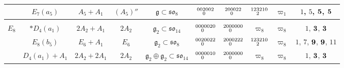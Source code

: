 \documentclass{amsart}
\theoremstyle{definition}
\newcommand{\g}{\mathfrak{g}}
\newcommand{\0}{\mathcal{O}}
\begin{document}
\begin{table}[htp]
\begin{center}
\begin{tabular}{|c | c| c| c| c| c| c| c| c| c|}
& $E_7(a_5)$ & $A_5+A_1$ & $(A_5)''$ & $\g\subset\mathfrak{so}_8$ & $\scriptsize{\begin{aligned}00 &2002 \\[-1.8mm] &0\end{aligned}}$ & $\scriptsize{\begin{aligned}20 &0022 \\[-1.8mm] &0\end{aligned}}$ 
& $\scriptsize{\begin{aligned} 12 & 3210 \\[-1.8mm] & 2\end{aligned}}$ & $\varpi_1$ 
& $1$, $5$, ${\bf 5}$, ${\bf 5}$ \\

\hline & & & & & & &  & &  \\[-0.3cm]

$E_8$ & $*D_4(a_1)$ & $2A_2+A_1$ & $2A_2$ & $\g_2\subset\mathfrak{so}_{14}$  & $\scriptsize{\begin{aligned}00 &00020 \\[-1.8mm] &0\end{aligned}}$ & $\scriptsize{\begin{aligned}20 &00000 \\[-1.8mm] &0\end{aligned}}$ 
& $\varpi_8$ & $\varpi_8$ 
& $1$, ${\bf 3}$, ${\bf 3}$ \\

& $E_8(b_5)$ & $E_6+A_1$ & $E_6$ & $\g_2\subset \mathfrak{so}_8$ & $\scriptsize{\begin{aligned}00 &20022 \\[-1.8mm] &0\end{aligned}}$ & $\scriptsize{\begin{aligned}20 &00222 \\[-1.8mm] &0\end{aligned}}$ 
& $\scriptsize{\begin{aligned} 12 & 3210 \\[-1.8mm] & 2\end{aligned}}$ & $\varpi_8$ 
& $1$, $7$, ${\bf 9}$, ${\bf 9}$, $11$ \\
& $D_4(a_1)+A_1$ & $2A_2+2A_1$ & $2A_2$ & $\g_2\oplus\g_2\subset\mathfrak{so}_{14}$ & $\scriptsize{\begin{aligned}00 &00010 \\[-1.8mm] &0\end{aligned}}$ & $\scriptsize{\begin{aligned}20 &00000 \\[-1.8mm] &0\end{aligned}}$ 
& $\varpi_8$ & $\varpi_8$ 
& $1$, ${\bf 3}$, ${\bf 3}$ \\

 \hline
\end{tabular}
\end{center}
\end{table}
\end{document}
